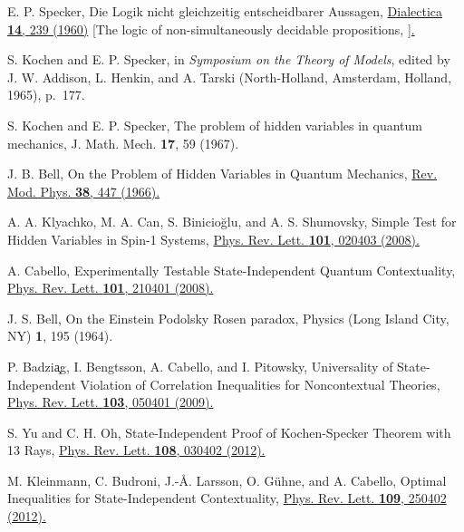 \documentclass[%
 twocolumn,
 groupedaddress,
 showpacs,
 showkeys,
 preprintnumbers,
 amsmath,amssymb,
 aps,
 pra,
 longbibliography,
 floatfix,
 ]{revtex4-1}
\begin{document}
\begin{thebibliography}{99}
	
	
E. P. Specker,
Die Logik nicht gleichzeitig entscheidbarer Aussagen,
\href{http://dx.doi.org/10.1111/j.1746-8361.1960.tb00422.x}{Dialectica \textbf{14}, 239 (1960)}
[The logic of non-simultaneously decidable propositions, \href{http://arxiv.org/abs/1103.4537}{].}

S. Kochen and E. P. Specker,
in {\it Symposium on the Theory of Models}, edited by J. W. Addison, L. Henkin, and A. Tarski
(North-Holland, Amsterdam, Holland, 1965), p.~177.
	
S. Kochen and E. P. Specker,
The problem of hidden variables in quantum mechanics,
J. Math. Mech. \textbf{17}, 59 (1967).

J. B. Bell,
On the Problem of Hidden Variables in Quantum Mechanics,
\href{http://dx.doi.org/10.1103/RevModPhys.38.447}{Rev. Mod. Phys. \textbf{38}, 447 (1966).}
	
A. A. Klyachko, M. A. Can, S. Binicio\u{g}lu, and A. S. Shumovsky,
Simple Test for Hidden Variables in Spin-1 Systems,
\href{http://dx.doi.org/10.1103/PhysRevLett.101.020403}{Phys. Rev. Lett. \textbf{101}, 020403 (2008).}

A. Cabello,
Experimentally Testable State-Independent Quantum Contextuality,
\href{http://dx.doi.org/10.1103/PhysRevLett.101.210401}{Phys. Rev. Lett. \textbf{101}, 210401 (2008).}

J. S. Bell,
On the Einstein Podolsky Rosen paradox,
Physics (Long Island City, NY) \textbf{1}, 195 (1964).

P. Badzi{\c a}g, I. Bengtsson, A. Cabello, and I. Pitowsky,
Universality of State-Independent Violation of Correlation Inequalities for Noncontextual Theories,
\href{https://doi.org/10.1103/PhysRevLett.103.050401}{Phys. Rev. Lett. \textbf{103}, 050401 (2009).}

S. Yu and C. H. Oh,
State-Independent Proof of Kochen-Specker Theorem with 13 Rays,
\href{http://dx.doi.org/10.1103/PhysRevLett.108.030402}{Phys. Rev. Lett. \textbf{108}, 030402 (2012).}

M. Kleinmann, C. Budroni, J.-\AA. Larsson, O. G{\"u}hne, and A. Cabello,
Optimal Inequalities for State-Independent Contextuality,
\href{http://dx.doi.org/10.1103/PhysRevLett.109.250402}{Phys. Rev. Lett. \textbf{109}, 250402 (2012).}


\end{thebibliography}
\end{document}
